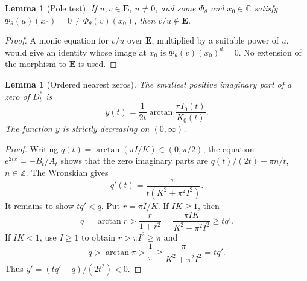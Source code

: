 \documentclass[11pt]{article}
\newtheorem{lemma}[theorem]{Lemma}
\theoremstyle{definition}
\theoremstyle{remark}
\newcommand{\E}{\mathbf E}
\newcommand{\Ebar}{\overline{\mathbf E}}
\begin{document}
\begin{lemma}[Pole test]\label{intlin:pole}
If $u,v\in\E$, $u\ne0$, and some $\Phi_\theta$ and $x_0\in\mathbb C$ satisfy
$\Phi_\theta(u)(x_0)=0\ne\Phi_\theta(v)(x_0)$, then $v/u\notin\Ebar$.
\end{lemma}
\begin{proof}
A monic equation for $v/u$ over $\E$, multiplied by a suitable power
of $u$, would give an identity whose image at $x_0$ is
$\Phi_\theta(v)(x_0)^d=0$. No extension of the morphism to $\Ebar$ is used.
\end{proof}

\begin{lemma}[Ordered nearest zeros]\label{intlin:zeros}
The smallest positive imaginary part of a zero of $D_t^*$ is
\[
y(t)=\frac{1}{2t}\arctan\frac{\pi I_0(t)}{K_0(t)}.
\]
The function $y$ is strictly decreasing on $(0,\infty)$.
\end{lemma}
\begin{proof}
Writing $q(t)=\arctan(\pi I/K)\in(0,\pi/2)$, the equation
$e^{2tx}=-B_t/A_t$ shows that the zero imaginary parts are
$q(t)/(2t)+\pi n/t$, $n\in\mathbb Z$. The Wronskian gives
\[
q'(t)=\frac{\pi}{t(K^2+\pi^2I^2)}.
\]
It remains to show $tq'<q$. Put $r=\pi I/K$. If $IK\ge1$, then
\[
q=\arctan r>\frac{r}{1+r^2}
 =\frac{\pi IK}{K^2+\pi^2I^2}\ge tq'.
\]
If $IK<1$, use $I\ge1$ to obtain $r>\pi I^2\ge\pi$ and
\[
q>\arctan\pi>\frac1\pi
 \ge\frac{\pi}{K^2+\pi^2I^2}=tq'.
\]
Thus $y'=(tq'-q)/(2t^2)<0$.
\end{proof}
\end{document}
